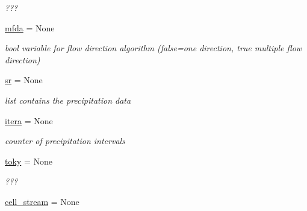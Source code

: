 \begin{DoxyCompactItemize}
\begin{DoxyCompactList}\small\item\em ??? \end{DoxyCompactList}\item 
\hypertarget{namespacesmoderp2d_1_1glob_ac24c449383e41278237bed6d4a654e9c}{\hyperlink{namespacesmoderp2d_1_1glob_ac24c449383e41278237bed6d4a654e9c}{mfda} = None}\label{namespacesmoderp2d_1_1glob_ac24c449383e41278237bed6d4a654e9c}

\begin{DoxyCompactList}\small\item\em bool variable for flow direction algorithm (false=one direction, true multiple flow direction) \end{DoxyCompactList}\item 
\hypertarget{namespacesmoderp2d_1_1glob_a8521fb1b04a2a3195d06b722c4ea7450}{\hyperlink{namespacesmoderp2d_1_1glob_a8521fb1b04a2a3195d06b722c4ea7450}{sr} = None}\label{namespacesmoderp2d_1_1glob_a8521fb1b04a2a3195d06b722c4ea7450}

\begin{DoxyCompactList}\small\item\em list contains the precipitation data \end{DoxyCompactList}\item 
\hypertarget{namespacesmoderp2d_1_1glob_a2eefe574a5d28a03d51bfccf604efbb3}{\hyperlink{namespacesmoderp2d_1_1glob_a2eefe574a5d28a03d51bfccf604efbb3}{itera} = None}\label{namespacesmoderp2d_1_1glob_a2eefe574a5d28a03d51bfccf604efbb3}

\begin{DoxyCompactList}\small\item\em counter of precipitation intervals \end{DoxyCompactList}\item 
\hypertarget{namespacesmoderp2d_1_1glob_abfd7615e3f6d5288be3e216664d05a23}{\hyperlink{namespacesmoderp2d_1_1glob_abfd7615e3f6d5288be3e216664d05a23}{toky} = None}\label{namespacesmoderp2d_1_1glob_abfd7615e3f6d5288be3e216664d05a23}

\begin{DoxyCompactList}\small\item\em ??? \end{DoxyCompactList}\item 
\hypertarget{namespacesmoderp2d_1_1glob_aae3409bd0492f47d9cc9ce221aad9eb2}{\hyperlink{namespacesmoderp2d_1_1glob_aae3409bd0492f47d9cc9ce221aad9eb2}{cell\-\_\-stream} = None}\label{namespacesmoderp2d_1_1glob_aae3409bd0492f47d9cc9ce221aad9eb2}


\end{DoxyCompactItemize}
